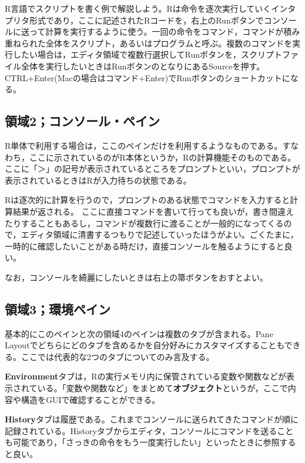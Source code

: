 \documentclass[
  a4paper,
]{ltjsbook}
\begin{document}
R言語でスクリプトを書く例で解説しよう。Rは命令を逐次実行していくインタプリタ形式であり，ここに記述されたRコードを，右上のRunボタンでコンソールに送って計算を実行するように使う。一回の命令をコマンド，コマンドが積み重ねられた全体をスクリプト，あるいはプログラムと呼ぶ。複数のコマンドを実行したい場合は，エディタ領域で複数行選択してRunボタンを，スクリプトファイル全体を実行したいときはRunボタンのとなりにあるSourceを押す。CTRL+Enter(Macの場合はコマンド+Enter)でRunボタンのショートカットになる。

\hypertarget{ux9818ux57df2ux30b3ux30f3ux30bdux30fcux30ebux30daux30a4ux30f3}{%
\subsection{領域2；コンソール・ペイン}\label{ux9818ux57df2ux30b3ux30f3ux30bdux30fcux30ebux30daux30a4ux30f3}}

R単体で利用する場合は，ここのペインだけを利用するようなものである。すなわち，ここに示されているのがR本体というか，Rの計算機能そのものである。ここに「＞」の記号が表示されているところをプロンプトといい，プロンプトが表示されているときはRが入力待ちの状態である。

Rは逐次的に計算を行うので，プロンプトのある状態でコマンドを入力すると計算結果が返される。
ここに直接コマンドを書いて行っても良いが，書き間違えたりすることもあるし，コマンドが複数行に渡ることが一般的になってくるので，エディタ領域に清書するつもりで記述していったほうがよい。ごくたまに，一時的に確認したいことがある時だけ，直接コンソールを触るようにすると良い。

なお，コンソールを綺麗にしたいときは右上の箒ボタンをおすとよい。

\hypertarget{ux9818ux57df3ux74b0ux5883ux30daux30a4ux30f3}{%
\subsection{領域3；環境ペイン}\label{ux9818ux57df3ux74b0ux5883ux30daux30a4ux30f3}}

基本的にこのペインと次の領域4のペインは複数のタブが含まれる。Pane
Layoutでどちらにどのタブを含めるかを自分好みにカスタマイズすることもできる。ここでは代表的な2つのタブについてのみ言及する。

\textbf{Environment}タブは，Rの実行メモリ内に保管されている変数や関数などが表示されている。「変数や関数など」をまとめて\textbf{オブジェクト}というが，ここで内容や構造をGUIで確認することができる。

\textbf{History}タブは履歴である。これまでコンソールに送られてきたコマンドが順に記録されている。Historyタブからエディタ，コンソールにコマンドを送ることも可能であり，「さっきの命令をもう一度実行したい」といったときに参照すると良い。
\end{document}
